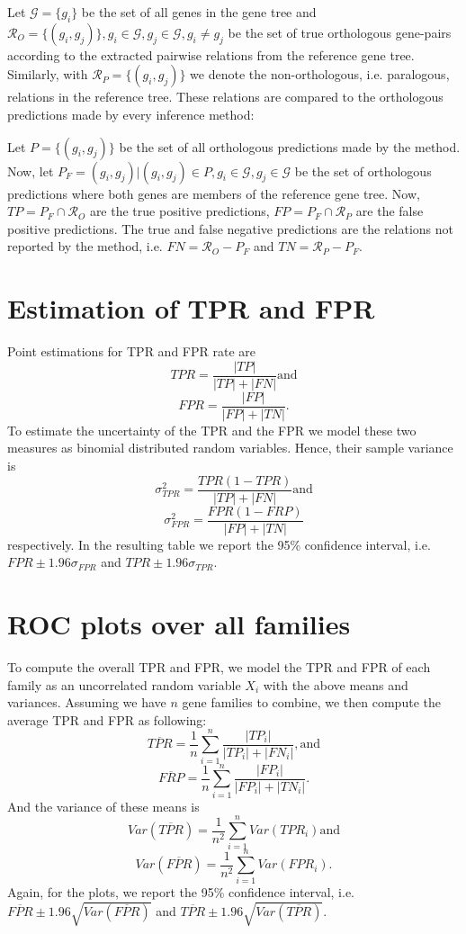 \documentclass[a4paper,11pt]{article}
\begin{document}
Let $\mathcal{G}=\{g_i\}$ be the set of all genes in the gene tree and $\mathcal{R}_O=\{(g_i,g_j)\}, g_i \in \mathcal{G}, g_j \in \mathcal{G}, g_i \ne g_j$ be the set of true orthologous gene-pairs according to the extracted pairwise relations from the reference gene tree. Similarly, with $\mathcal{R}_P=\{(g_i,g_j)\}$ we denote the non-orthologous, i.e. paralogous, relations in the reference tree. These relations are compared to the orthologous predictions made by every inference method:

Let $P = \{(g_i,g_j)\}$ be the set of all orthologous predictions made by the method. Now, let $P_F = (g_i,g_j) | (g_i,g_j) \in P, g_i \in \mathcal{G}, g_j \in \mathcal{G}$ be the set of orthologous predictions where both genes are members of the reference gene tree. Now, $TP = P_F \cap \mathcal{R}_O$ are the true positive predictions, $FP = P_F \cap \mathcal{R}_P$ are the false positive predictions. The true and false negative predictions are the relations not reported by the method, i.e. $FN = \mathcal{R}_O - P_F$ and $TN = \mathcal{R}_P - P_F$.

\section*{Estimation of TPR and FPR}
Point estimations for TPR and FPR rate are 
$$TPR=\frac{|TP|}{|TP|+|FN|} \mathrm{and}$$
$$FPR=\frac{|FP|}{|FP|+|TN|}.$$ 
To estimate the uncertainty  of the TPR and the FPR we model these two measures as binomial distributed random variables. Hence, their sample variance is 
$$\sigma_{TPR}^2 = \frac{TPR (1-TPR)}{|TP|+|FN|} \mathrm{and}$$
$$\sigma_{FPR}^2 = \frac{FPR (1-FRP)}{|FP|+|TN|}$$ respectively. In the resulting table we report the 95\% confidence interval, i.e. $FPR \pm 1.96\sigma_{FPR}$ and $TPR \pm 1.96\sigma_{TPR}$.

\section*{ROC plots over all families}
To compute the overall TPR and FPR, we model the TPR and FPR of each family as an uncorrelated random variable $X_i$ with the above means and variances. Assuming we have $n$ gene families to combine, we then compute the average TPR and FPR as following:
$$\overline{TPR} = \frac{1}{n} \sum_{i=1}^{n} \frac{|TP_i|}{|TP_i|+|FN_i|}, \mathrm{and}$$
$$\overline{FRP} = \frac{1}{n} \sum_{i=1}^{n} \frac{|FP_i|}{|FP_i|+|TN_i|}.$$
And the variance of these means is 
$$Var(\overline{TPR}) = \frac{1}{n^2}\sum_{i=1}^{n}Var(TPR_i) \mathrm{and}$$
$$Var(\overline{FPR}) = \frac{1}{n^2}\sum_{i=1}^{n}Var(FPR_i).$$
Again, for the plots, we report the 95\% confidence interval, i.e. $\overline{FPR} \pm 1.96 \sqrt{Var(\overline{FPR})}$ and $\overline{TPR} \pm 1.96 \sqrt{Var(\overline{TPR})}$. 
\end{document}
